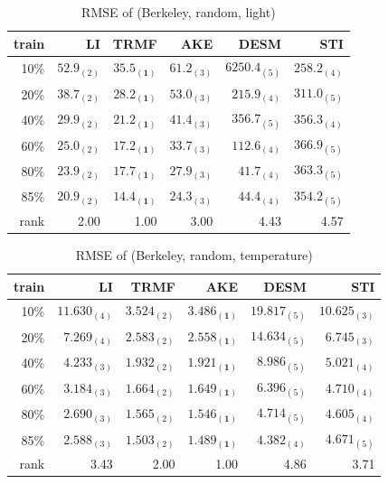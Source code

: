 \begin{table} [htbp]
\centering
\caption{RMSE of (Berkeley, random, light)}
\label{table:berkeley_random_light}
\begin{tabular}{ r |  r r r r r}
	train	&LI	&TRMF	&AKE	&DESM	&STI\\ \hline
	10\% & $ 52.9_{(2)} $ & $ \mathbf{ 35.5_{(1)} } $ & $ 61.2_{(3)} $ & $ 6250.4_{(5)} $ & $ 258.2_{(4)} $ \\
	20\% & $ 38.7_{(2)} $ & $ \mathbf{ 28.2_{(1)} } $ & $ 53.0_{(3)} $ & $ 215.9_{(4)} $ & $ 311.0_{(5)} $ \\
	40\% & $ 29.9_{(2)} $ & $ \mathbf{ 21.2_{(1)} } $ & $ 41.4_{(3)} $ & $ 356.7_{(5)} $ & $ 356.3_{(4)} $ \\
	60\% & $ 25.0_{(2)} $ & $ \mathbf{ 17.2_{(1)} } $ & $ 33.7_{(3)} $ & $ 112.6_{(4)} $ & $ 366.9_{(5)} $ \\
	80\% & $ 23.9_{(2)} $ & $ \mathbf{ 17.7_{(1)} } $ & $ 27.9_{(3)} $ & $ 41.7_{(4)} $ & $ 363.3_{(5)} $ \\
	85\% & $ 20.9_{(2)} $ & $ \mathbf{ 14.4_{(1)} } $ & $ 24.3_{(3)} $ & $ 44.4_{(4)} $ & $ 354.2_{(5)} $ \\ \hline
	rank &2.00 &1.00 &3.00 &4.43 &4.57 \\
\end{tabular}
\end{table}

\begin{table}[htbp]
\centering
\caption{RMSE of (Berkeley, random, temperature)}
\label{table:berkeley_random_tem}
\begin{tabular}{ r | r r r r r}
	train	&LI	&TRMF	&AKE	&DESM	&STI\\ \hline
	10\% & $ 11.630_{(4)} $ & $ 3.524_{(2)} $ & $ \mathbf{ 3.486_{(1)} } $ & $ 19.817_{(5)} $ & $ 10.625_{(3)} $ \\
	20\% & $ 7.269_{(4)} $ & $ 2.583_{(2)} $ & $ \mathbf{ 2.558_{(1)} } $ & $ 14.634_{(5)} $ & $ 6.745_{(3)} $ \\
	40\% & $ 4.233_{(3)} $ & $ 1.932_{(2)} $ & $ \mathbf{ 1.921_{(1)} } $ & $ 8.986_{(5)} $ & $ 5.021_{(4)} $ \\
	60\% & $ 3.184_{(3)} $ & $ 1.664_{(2)} $ & $ \mathbf{ 1.649_{(1)} } $ & $ 6.396_{(5)} $ & $ 4.710_{(4)} $ \\
	80\% & $ 2.690_{(3)} $ & $ 1.565_{(2)} $ & $ \mathbf{ 1.546_{(1)} } $ & $ 4.714_{(5)} $ & $ 4.605_{(4)} $ \\
	85\% & $ 2.588_{(3)} $ & $ 1.503_{(2)} $ & $ \mathbf{ 1.489_{(1)} } $ & $ 4.382_{(4)} $ & $ 4.671_{(5)} $ \\ \hline
	rank &3.43 &2.00 &1.00 &4.86 &3.71 \\
\end{tabular}
\end{table}

